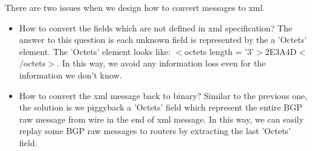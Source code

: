 






There are two issues when we design how to convert messages to xml.
\begin{itemize}
\item{How to convert the fields which are not defined in xml specification?  The answer to this question is each unknown field is represented by the a 'Octets'
   element.  The 'Octets' element looks like: $<$octets length = '3'$>$2E3A4D$<$$/$octets$>$. In this way, we avoid any information loss even for the information we don't know.}
\item{How to convert the xml message back to binary?  Similar to the previous one, the solution is we piggyback a 'Octets' field which represent the entire BGP raw message from wire in the end of xml message. In this way, we can easily replay some BGP raw messages to routers by extracting the last 'Octets' field.  }
\end{itemize} 




